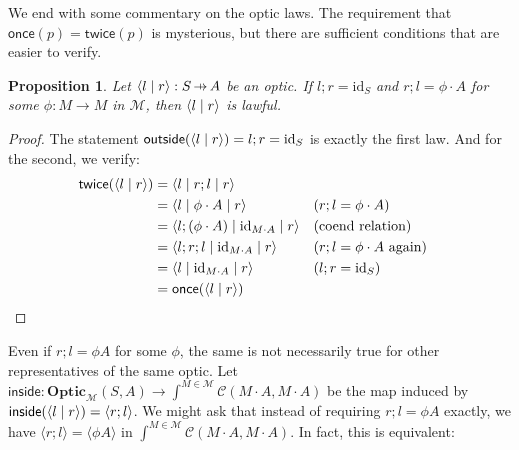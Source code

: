 \documentclass[11pt,letterpaper]{article}
\theoremstyle{plain}
\newtheorem{proposition}[theorem]{Proposition}
\theoremstyle{definition}
\newcommand{\C}{\mathscr{C}}
\newcommand{\M}{\mathscr{M}}
\newcommand{\Optic}{\mathbf{Optic}}
\newcommand{\id}{\mathrm{id}}
\newcommand{\act}{\cdot}
\newcommand{\rep}[2]{{\ensuremath \left\langle #1 \mid #2 \right\rangle}}
\newcommand{\repthree}[3]{{\ensuremath \langle #1 \mid #2 \mid #3 \rangle}}
\newcommand{\inside}{\mathsf{inside}}
\newcommand{\outside}{\mathsf{outside}}
\newcommand{\once}{\mathsf{once}}
\newcommand{\twice}{\mathsf{twice}}
\newcommand{\hto}{\ensuremath{\,\mathaccent\shortmid\rightarrow\,}}
\begin{document}
We end with some commentary on the optic laws. The requirement that $\once(p) = \twice(p)$ is mysterious, but there are sufficient conditions that are easier to verify.

\begin{proposition}
  Let $\rep{l}{r} : S \hto A$ be an optic. If $l;r = \id_S$ and $r;l = \phi \act A$ for some $\phi : M \to M$ in $\M$, then $\rep{l}{r}$ is lawful.
\end{proposition}
\begin{proof}
  The statement $\outside(\rep{l}{r}) = l;r = \id_S$ is exactly the first law. And for the second, we verify:
  \begin{align*}
    \twice(\rep{l}{r})
    &= \repthree{l}{r;l}{r} \\
    &= \repthree{l}{\phi \act A}{r} && \text{($r;l = \phi \act A$)}\\
    &= \repthree{l ; (\phi \act A)}{\id_{M\act A}}{r} && \text{(coend relation)} \\
    &= \repthree{l;r;l}{\id_{M\act A}}{r} && \text{($r;l = \phi \act A$ again)}\\
    &= \repthree{l}{\id_{M\act A}}{r}  && \text{($l;r = \id_S$)}\\
    &= \once(\rep{l}{r})
  \end{align*}
\end{proof}

Even if $r;l = \phi A$ for some $\phi$, the same is not necessarily true for other representatives of the same optic. Let $\inside : \Optic_\M(S, A) \to \int^{M \in \M} \C(M \act  A, M \act  A)$ be the map induced by $\inside(\rep{l}{r}) = \langle r ; l \rangle$. We might ask that instead of requiring $r;l = \phi A$ exactly, we have $\langle r ; l \rangle = \langle \phi A \rangle$ in $\int^{M \in \M} \C(M \act  A, M \act  A)$. In fact, this is equivalent:
\end{document}
